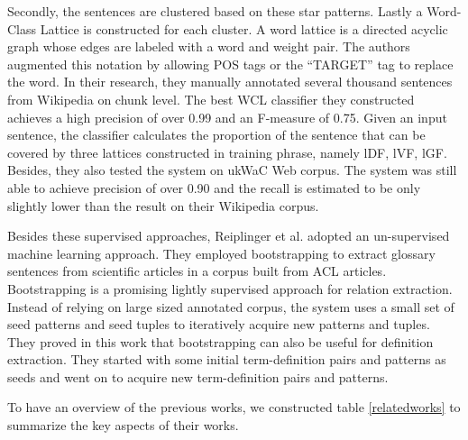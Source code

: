 \documentclass[hyp]{socreport}
\begin{document}
\noindent 
Secondly, the sentences are clustered based on these star patterns. Lastly a Word-Class Lattice is constructed for each cluster. A word lattice is a directed acyclic graph whose edges are labeled with a word and weight pair. The authors augmented this notation by allowing POS tags or the ``TARGET'' tag to replace the word. In their research, they manually annotated several thousand sentences from Wikipedia on chunk level. The best WCL classifier they constructed achieves a high precision of over 0.99 and an F-measure of 0.75. Given an input sentence, the classifier calculates the proportion of the sentence that can be covered by three lattices constructed in training phrase, namely lDF, lVF, lGF. Besides, they also tested the system on ukWaC Web corpus. The system was still able to achieve precision of over 0.90 and the recall is estimated to be only slightly lower than the result on their Wikipedia corpus. 

Besides these supervised approaches, Reiplinger et al. \cite{Reiplinger12} adopted an un-supervised machine learning approach. They employed bootstrapping to extract glossary sentences from scientific articles in a corpus built from ACL articles. Bootstrapping is a promising lightly supervised approach for relation extraction. Instead of relying on large sized annotated corpus, the system uses a small set of seed patterns and seed tuples to iteratively acquire new patterns and tuples. They proved in this work that bootstrapping can also be useful for definition extraction. They started with some initial term-definition pairs and patterns as seeds and went on to acquire new term-definition pairs and patterns.

To have an overview of the previous works, we constructed table \ref{relatedworks} to summarize the key aspects of their works.
\end{document}
